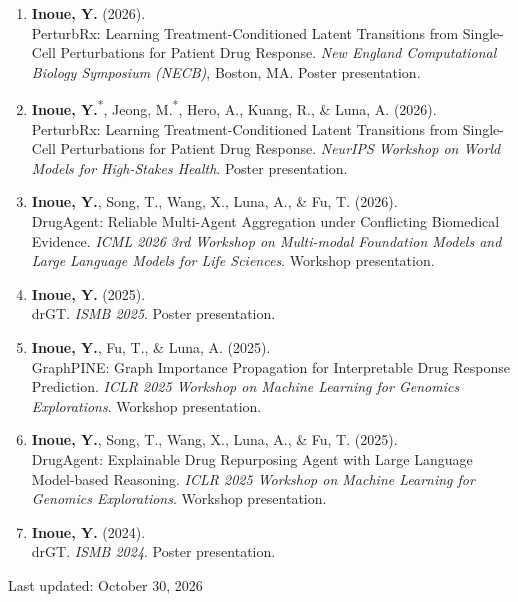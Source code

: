 \documentclass[11pt]{article}
\newcommand{\publication}[3]{%
  \entryspace\item #1\\
  #2. #3
}
\begin{document}

\begin{enumerate}[label={W\arabic*.}]

  \publication
  {\textbf{Inoue, Y.} (2026).}
  {PerturbRx: Learning Treatment-Conditioned Latent Transitions from Single-Cell Perturbations for Patient Drug Response}
  {\textit{New England Computational Biology Symposium (NECB)}, Boston, MA. Poster presentation.}

  \publication
  {\textbf{Inoue, Y.}\textsuperscript{*}, Jeong, M.\textsuperscript{*}, Hero, A., Kuang, R., \& Luna, A. (2026).}
  {PerturbRx: Learning Treatment-Conditioned Latent Transitions from Single-Cell Perturbations for Patient Drug Response}
  {\textit{NeurIPS Workshop on World Models for High-Stakes Health}. Poster presentation.}

  \publication
  {\textbf{Inoue, Y.}, Song, T., Wang, X., Luna, A., \& Fu, T. (2026).}
  {DrugAgent: Reliable Multi-Agent Aggregation under Conflicting Biomedical Evidence}
  {\textit{ICML 2026 3rd Workshop on Multi-modal Foundation Models and Large Language Models for Life Sciences}. Workshop presentation.}

  \publication
  {\textbf{Inoue, Y.} (2025).}
  {drGT}
  {\textit{ISMB 2025}. Poster presentation.}

  \publication
  {\textbf{Inoue, Y.}, Fu, T., \& Luna, A. (2025).}
  {GraphPINE: Graph Importance Propagation for Interpretable Drug Response Prediction}
  {\textit{ICLR 2025 Workshop on Machine Learning for Genomics Explorations}. Workshop presentation.}

  \publication
  {\textbf{Inoue, Y.}, Song, T., Wang, X., Luna, A., \& Fu, T. (2025).}
  {DrugAgent: Explainable Drug Repurposing Agent with Large Language Model-based Reasoning}
  {\textit{ICLR 2025 Workshop on Machine Learning for Genomics Explorations}. Workshop presentation.}

  \publication
  {\textbf{Inoue, Y.} (2024).}
  {drGT}
  {\textit{ISMB 2024}. Poster presentation.}

\end{enumerate}

\vspace{1em}
\begin{center}
  \begin{footnotesize}
    Last updated: October 30, 2026
  \end{footnotesize}
\end{center}
\end{document}
